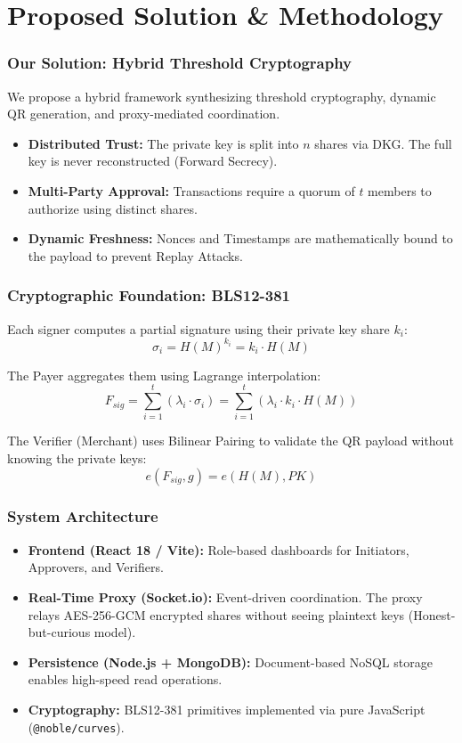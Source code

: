 \documentclass{beamer}
\begin{document}
\section{Proposed Solution \& Methodology}
\begin{frame}
  \frametitle{Our Solution: Hybrid Threshold Cryptography}
  We propose a hybrid framework synthesizing threshold cryptography, dynamic QR generation, and proxy-mediated coordination.
  \vspace{0.3cm}
  \begin{itemize}
      \item \textbf{Distributed Trust:} The private key is split into $n$ shares via DKG. The full key is never reconstructed (Forward Secrecy).
      \item \textbf{Multi-Party Approval:} Transactions require a quorum of $t$ members to authorize using distinct shares.
      \item \textbf{Dynamic Freshness:} Nonces and Timestamps are mathematically bound to the payload to prevent Replay Attacks.
  \end{itemize}
\end{frame}

\begin{frame}
  \frametitle{Cryptographic Foundation: BLS12-381}
  Each signer computes a partial signature using their private key share $k_i$:
  $$ \sigma_i = H(M)^{k_i} = k_i \cdot H(M) $$
  
  The Payer aggregates them using Lagrange interpolation:
  $$ F_{sig} = \sum_{i=1}^{t} (\lambda_i \cdot \sigma_i) = \sum_{i=1}^{t} (\lambda_i \cdot k_i \cdot H(M)) $$
  
  The Verifier (Merchant) uses Bilinear Pairing to validate the QR payload without knowing the private keys:
  $$ e(F_{sig}, g) = e(H(M), PK) $$
\end{frame}

\begin{frame}
  \frametitle{System Architecture}
  \begin{itemize}
      \item \textbf{Frontend (React 18 / Vite):} Role-based dashboards for Initiators, Approvers, and Verifiers.
      \item \textbf{Real-Time Proxy (Socket.io):} Event-driven coordination. The proxy relays AES-256-GCM encrypted shares without seeing plaintext keys (Honest-but-curious model).
      \item \textbf{Persistence (Node.js + MongoDB):} Document-based NoSQL storage enables high-speed read operations.
      \item \textbf{Cryptography:} BLS12-381 primitives implemented via pure JavaScript (\texttt{@noble/curves}).
  \end{itemize}
\end{frame}
\end{document}
